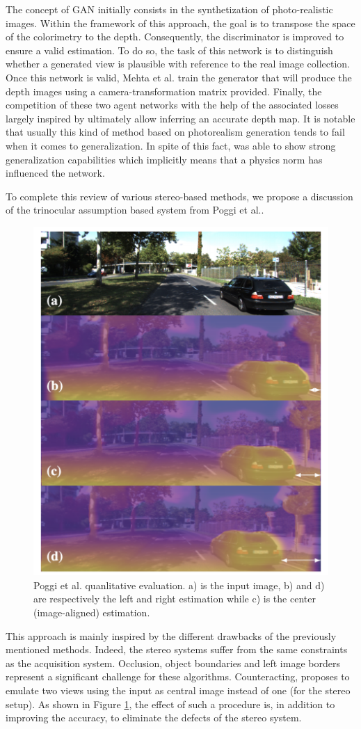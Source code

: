 The concept of GAN initially consists in the synthetization of photo-realistic images. Within the framework of this approach, the goal is to transpose the space of the colorimetry to the depth. Consequently, the discriminator is improved to ensure a valid estimation. To do so, the task of this network is to distinguish whether a generated view is plausible with reference to the real image collection. Once this network is valid, Mehta et al. \cite{mehta2018structured} train the generator that will produce the depth images using a camera-transformation matrix provided. Finally, the competition of these two agent networks with the help of the associated losses largely inspired by \cite{godard2017unsupervised} 
ultimately allow inferring an accurate depth map.
It is notable that usually this kind of method based on photorealism generation tends to fail when it comes to generalization. In spite of this fact, \cite{mehta2018structured} was able to show strong generalization capabilities which implicitly means that a physics norm has influenced the network.


To complete this review of various stereo-based methods, we propose a discussion of the trinocular assumption based system from Poggi et al.\cite{poggi2018learning}. 

\begin{figure}[h]
	\centering
	\includegraphics[width=0.5\linewidth]{Figures/SOA/illupoggi}
	\caption[Poggi et al. quanlitative evaluation.]{Poggi et al. quanlitative evaluation. a) is the input image, b) and d) are respectively the left and right estimation while c) is the center (image-aligned) estimation.}
	\label{illupoggi}
\end{figure}


This approach is mainly inspired by the different drawbacks of the previously mentioned methods. Indeed, the stereo systems suffer from the same constraints as the acquisition system. Occlusion, object boundaries and left image borders represent a significant challenge for these algorithms. Counteracting, \cite{poggi2018learning} proposes to emulate two views using the input as central image instead of one (for the stereo setup). As shown in Figure \ref{illupoggi}, the effect of such a procedure is, in addition to improving the accuracy, to eliminate the defects of the stereo system.


